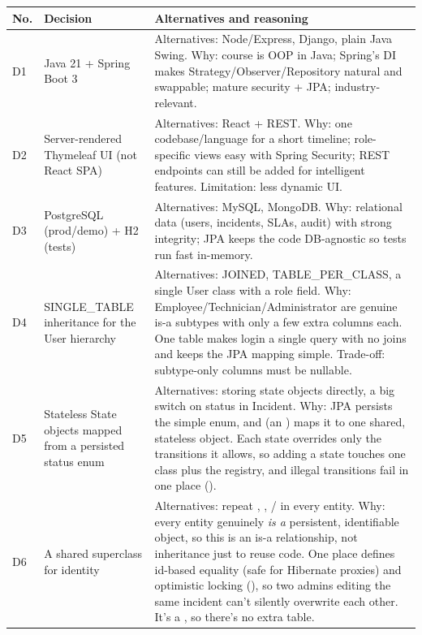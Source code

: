 \begin{longtable}{@{}L{0.9cm}L{4.3cm}L{10cm}@{}}
\toprule
\textbf{No.} & \textbf{Decision} & \textbf{Alternatives and reasoning} \\
\midrule\endhead
D1 & Java 21 + Spring Boot 3 & Alternatives: Node/Express, Django, plain Java Swing. Why: course is OOP in Java; Spring's DI makes Strategy/Observer/Repository natural and swappable; mature security + JPA; industry-relevant. \\
D2 & Server-rendered Thymeleaf UI (not React SPA) & Alternatives: React + REST. Why: one codebase/language for a short timeline; role-specific views easy with Spring Security; REST endpoints can still be added for intelligent features. Limitation: less dynamic UI. \\
D3 & PostgreSQL (prod/demo) + H2 (tests) & Alternatives: MySQL, MongoDB. Why: relational data (users, incidents, SLAs, audit) with strong integrity; JPA keeps the code DB-agnostic so tests run fast in-memory. \\
D4 & SINGLE\_TABLE inheritance for the User hierarchy & Alternatives: JOINED, TABLE\_PER\_CLASS, a single User class with a role field. Why: Employee/Technician/Administrator are genuine is-a subtypes with only a few extra columns each. One table makes login a single query with no joins and keeps the JPA mapping simple. Trade-off: subtype-only columns must be nullable. \\
D5 & Stateless State objects mapped from a persisted status enum & Alternatives: storing state objects directly, a big switch on status in Incident. Why: JPA persists the simple  enum, and  (an ) maps it to one shared, stateless  object. Each state overrides only the transitions it allows, so adding a state touches one class plus the registry, and illegal transitions fail in one place (). \\
D6 & A shared  superclass for identity & Alternatives: repeat , , / in every entity. Why: every entity genuinely \textit{is a} persistent, identifiable object, so this is an is-a relationship, not inheritance just to reuse code. One place defines id-based equality (safe for Hibernate proxies) and optimistic locking (), so two admins editing the same incident can't silently overwrite each other. It's a , so there's no extra table. \\

\end{longtable}
